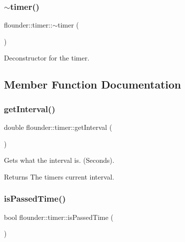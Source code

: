 \subsubsection{\texorpdfstring{$\sim$timer()}{~timer()}}
{\footnotesize\ttfamily flounder\+::timer\+::$\sim$timer (\begin{DoxyParamCaption}{ }\end{DoxyParamCaption})}



Deconstructor for the timer. 



\subsection{Member Function Documentation}
\mbox{\label{classflounder_1_1timer_a2e96c23a1baa9284269c000a6c6ba181}} 
\subsubsection{\texorpdfstring{get\+Interval()}{getInterval()}}
{\footnotesize\ttfamily double flounder\+::timer\+::get\+Interval (\begin{DoxyParamCaption}{ }\end{DoxyParamCaption})}



Gets what the interval is. (Seconds). 

\begin{DoxyReturn}{Returns}
The timers current interval. 
\end{DoxyReturn}
\mbox{\label{classflounder_1_1timer_a2758150edc9d0f3c8f1248183df7c0b5}} 
\subsubsection{\texorpdfstring{is\+Passed\+Time()}{isPassedTime()}}
{\footnotesize\ttfamily bool flounder\+::timer\+::is\+Passed\+Time (\begin{DoxyParamCaption}{ }\end{DoxyParamCaption})}



